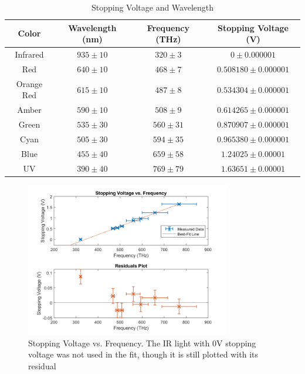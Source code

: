 \begin{table}[H]
    \centering
    \caption{Stopping Voltage and Wavelength}
    \label{tab:results1}
    \begin{tabular}{|c|c|c|c|}
        \hline
        Color      & Wavelength (nm) & Frequency (THz) & Stopping Voltage (V)    \\ \hline
        Infrared   & $935\pm10$      & $320\pm3$       & $0\pm0.000001$          \\ \hline
        Red        & $640\pm10$      & $468\pm7$       & $0.508180 \pm 0.000001$ \\ \hline
        Orange Red & $615\pm10$      & $487\pm8$       & $0.534304 \pm 0.000001$ \\ \hline
        Amber      & $590\pm10$      & $508\pm9$       & $0.614265 \pm 0.000001$ \\ \hline
        Green      & $535\pm30$      & $560\pm31$      & $0.870907 \pm 0.000001$ \\ \hline
        Cyan       & $505\pm30$      & $594\pm35$      & $0.965380 \pm 0.000001$ \\ \hline
        Blue       & $455\pm40$      & $659\pm58$      & $1.24025 \pm 0.00001$   \\ \hline
        UV         & $390\pm40$      & $769\pm79$      & $1.63651 \pm 0.00001$   \\ \hline
    \end{tabular}
\end{table}
\begin{figure}
    \centering
    \includegraphics[width=0.8\textwidth]{Results/Part1/Frequency_vs_Stopping_Voltage.png}
    \caption{Stopping Voltage vs. Frequency. The IR light with 0V stopping voltage was not used in the fit, though it is still plotted with its residual}
    \label{fig:frequency_vs_voltage}
\end{figure}

